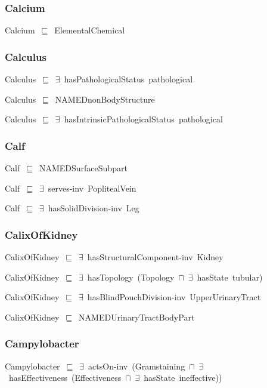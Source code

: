 \documentclass{article}
\begin{document}
\subsubsection*{Calcium}

Calcium~\ensuremath{\sqsubseteq}~ElementalChemical~

\subsubsection*{Calculus}

Calculus~\ensuremath{\sqsubseteq}~\ensuremath{\exists}~hasPathologicalStatus~pathological~

Calculus~\ensuremath{\sqsubseteq}~NAMEDnonBodyStructure~

Calculus~\ensuremath{\sqsubseteq}~\ensuremath{\exists}~hasIntrinsicPathologicalStatus~pathological~

\subsubsection*{Calf}

Calf~\ensuremath{\sqsubseteq}~NAMEDSurfaceSubpart~

Calf~\ensuremath{\sqsubseteq}~\ensuremath{\exists}~serves-inv~PoplitealVein~

Calf~\ensuremath{\sqsubseteq}~\ensuremath{\exists}~hasSolidDivision-inv~Leg~

\subsubsection*{CalixOfKidney}

CalixOfKidney~\ensuremath{\sqsubseteq}~\ensuremath{\exists}~hasStructuralComponent-inv~Kidney~

CalixOfKidney~\ensuremath{\sqsubseteq}~\ensuremath{\exists}~hasTopology~(Topology~\ensuremath{\sqcap}~\ensuremath{\exists}~hasState~tubular)~

CalixOfKidney~\ensuremath{\sqsubseteq}~\ensuremath{\exists}~hasBlindPouchDivision-inv~UpperUrinaryTract~

CalixOfKidney~\ensuremath{\sqsubseteq}~NAMEDUrinaryTractBodyPart~

\subsubsection*{Campylobacter}

Campylobacter~\ensuremath{\sqsubseteq}~\ensuremath{\exists}~actsOn-inv~(Gramstaining~\ensuremath{\sqcap}~\ensuremath{\exists}~hasEffectiveness~(Effectiveness~\ensuremath{\sqcap}~\ensuremath{\exists}~hasState~ineffective))~
\end{document}
